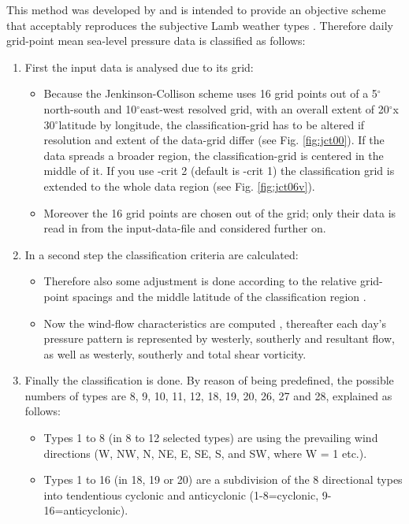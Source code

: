 \documentclass[12pt, oneside, a4paper, headsepline, plainheadsepline]{scrbook}
\newcommand{\degree}{\ensuremath{^\circ}}
\begin{document}
This method was developed by \citet{Jenkinson1977} and is intended to provide an objective scheme that acceptably reproduces the subjective Lamb weather types \citep{Jenkinson1977, Jones1992}. Therefore daily grid-point mean sea-level pressure data is classified as follows:
\begin{enumerate}
\item First the input data is analysed due to its grid:
  \begin{itemize}
  \item  Because the Jenkinson-Collison scheme uses 16 grid points out of a 5\degree north-south and 10\degree east-west resolved grid, with an overall extent of 20\degree x 30\degree latitude by longitude, the classification-grid has to be altered if resolution and extent of the data-grid differ (see Fig. \ref{fig:jct00}). If the data spreads a broader region, the classification-grid is centered in the middle of it. If you use -crit 2 (default is -crit 1) the classification grid is extended to the whole data region (see Fig. \ref{fig:jct06v}).
  \item Moreover the 16 grid points are chosen out of the grid; only their data is read in from the input-data-file and considered further on.
   \end{itemize}
\item In a second step the classification criteria are calculated:
  \begin{itemize}
  \item Therefore also some adjustment is done according to the relative grid-point spacings and the middle latitude of the classification region \citep{Tang2008}.
  \item Now the wind-flow characteristics are computed \citep{Jones1992}, thereafter each day's pressure pattern is represented by westerly, southerly and resultant flow, as well as westerly, southerly and total shear vorticity.
  \end{itemize}
\item Finally the classification is done. By reason of being predefined, the possible numbers of types are 8, 9, 10, 11, 12, 18, 19, 20, 26, 27 and 28, explained as follows:
  \begin{itemize}
  \item Types 1 to 8 (in 8 to 12 selected types) are using the prevailing wind directions (W, NW, N, NE, E, SE, S, and SW, where W = 1 etc.).
  \item Types 1 to 16 (in 18, 19 or 20) are a subdivision of the 8 directional types into tendentious cyclonic and anticyclonic (1-8=cyclonic, 9-16=anticyclonic).

\end{itemize}
\end{enumerate}
\end{document}
